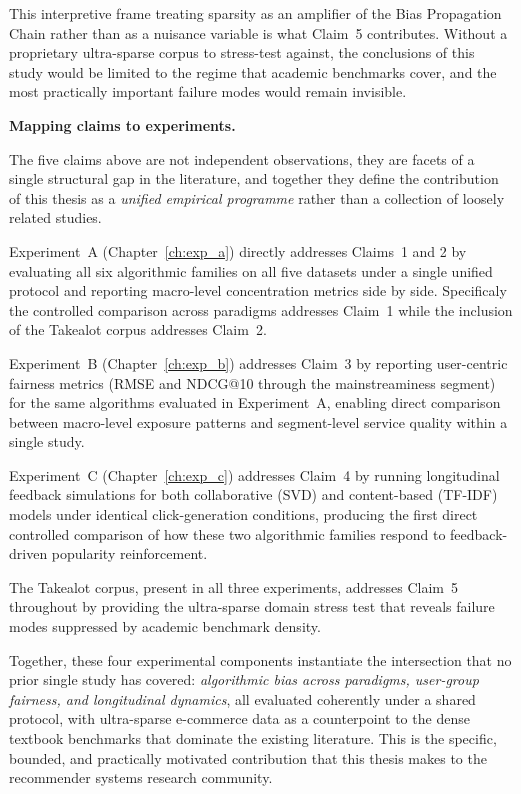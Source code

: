 \documentclass[11pt,a4paper]{report}
\begin{document}
This interpretive frame treating sparsity as an amplifier of the Bias Propagation Chain rather than as a nuisance variable is what Claim~5 contributes. Without a proprietary ultra-sparse corpus to stress-test against, the conclusions of this study would be limited to the regime that academic benchmarks cover, and the most practically important failure modes would remain invisible.

\vspace{0.75em}
\noindent\textbf{Mapping claims to experiments.}

The five claims above are not independent observations, they are facets of a single structural gap in the literature, and together they define the contribution of this thesis as a \emph{unified empirical programme} rather than a collection of loosely related studies.

Experiment~A (Chapter~\ref{ch:exp_a}) directly addresses Claims~1 and 2 by evaluating all six algorithmic families on all five datasets under a single unified protocol and reporting macro-level concentration metrics side by side. Specificaly the controlled comparison across paradigms addresses Claim~1 while the inclusion of the Takealot corpus addresses Claim~2.

Experiment~B (Chapter~\ref{ch:exp_b}) addresses Claim~3 by reporting user-centric fairness metrics (RMSE and NDCG@10 through the mainstreaminess segment) for the same algorithms evaluated in Experiment~A, enabling direct comparison between macro-level exposure patterns and segment-level service quality within a single study.

Experiment~C (Chapter~\ref{ch:exp_c}) addresses Claim~4 by running longitudinal feedback simulations for both collaborative (SVD) and content-based (TF-IDF) models under identical click-generation conditions, producing the first direct controlled comparison of how these two algorithmic families respond to feedback-driven popularity reinforcement.

The Takealot corpus, present in all three experiments, addresses Claim~5 throughout by providing the ultra-sparse domain stress test that reveals failure modes suppressed by academic benchmark density.

Together, these four experimental components instantiate the intersection that no prior single study has covered: \emph{algorithmic bias across paradigms, user-group fairness, and longitudinal dynamics}, all evaluated coherently under a shared protocol, with ultra-sparse e-commerce data as a counterpoint to the dense textbook benchmarks that dominate the existing literature. This is the specific, bounded, and practically motivated contribution that this thesis makes to the recommender systems research community.
\end{document}
